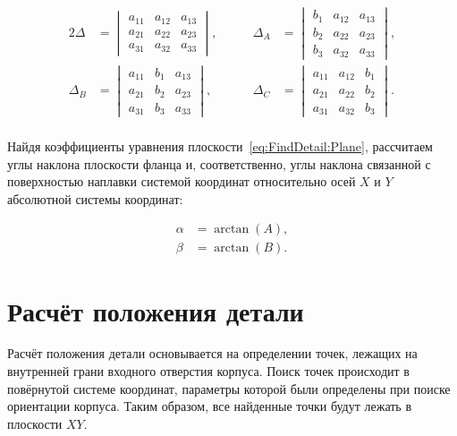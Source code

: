 \begin{alignat*}{2}
    \Delta &= \begin{vmatrix}
                  a_{11} & a_{12} & a_{13} \\
                  a_{21} & a_{22} & a_{23} \\
                  a_{31} & a_{32} & a_{33}
    \end{vmatrix}, & \qquad
    \Delta_A &= \begin{vmatrix}
                    b_1 & a_{12} & a_{13} \\
                    b_2 & a_{22} & a_{23} \\
                    b_3 & a_{32} & a_{33}
    \end{vmatrix}, \\
    \Delta_B &= \begin{vmatrix}
                    a_{11} & b_1 & a_{13} \\
                    a_{21} & b_2 & a_{23} \\
                    a_{31} & b_3 & a_{33}
    \end{vmatrix}, & \qquad
    \Delta_C &= \begin{vmatrix}
                    a_{11} & a_{12} & b_1 \\
                    a_{21} & a_{22} & b_2 \\
                    a_{31} & a_{32} & b_3
    \end{vmatrix}.
\end{alignat*} \\

Найдя коэффициенты уравнения плоскости~\ref{eq:FindDetail:Plane}, рассчитаем углы наклона плоскости фланца и, соответственно, углы наклона связанной с поверхностью наплавки системой координат относительно осей $X$ и $Y$ абсолютной системы координат:

\begin{align*}
    \alpha &= \arctan(A), \\
    \beta &= \arctan(B).
\end{align*}


\section{Расчёт положения детали} \label{sec:DetailPosition}
Расчёт положения детали основывается на определении точек, лежащих на внутренней грани входного отверстия корпуса.
Поиск точек происходит в повёрнутой системе координат, параметры которой были определены при поиске ориентации корпуса.
Таким образом, все найденные точки будут лежать в плоскости $XY$.

